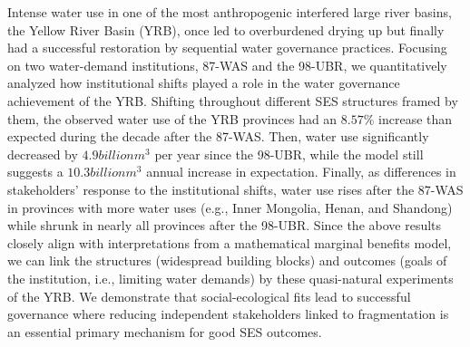 
Intense water use in one of the most anthropogenic interfered large river basins, the Yellow River Basin (YRB), once led to overburdened drying up but finally had a successful restoration by sequential water governance practices.
Focusing on two water-demand institutions, 87-WAS and the 98-UBR, we quantitatively analyzed how institutional shifts played a role in the water governance achievement of the YRB.
Shifting throughout different SES structures framed by them, the observed water use of the YRB provinces had an $8.57\%$ increase than expected during the decade after the 87-WAS.
Then, water use significantly decreased by  $4.9 billion m^3$ per year since the 98-UBR, while the model still suggests a $10.3 billion m^3$ annual increase in expectation.
Finally, as differences in stakeholders' response to the institutional shifts, water use rises after the 87-WAS in provinces with more water uses (e.g., Inner Mongolia, Henan, and Shandong) while shrunk in nearly all provinces after the 98-UBR.
Since the above results closely align with interpretations from a mathematical marginal benefits model, we can link the structures (widespread building blocks) and outcomes (goals of the institution, i.e., limiting water demands) by these quasi-natural experiments of the YRB.
We demonstrate that social-ecological fits lead to successful governance where reducing independent stakeholders linked to fragmentation is an essential primary mechanism for good SES outcomes.
